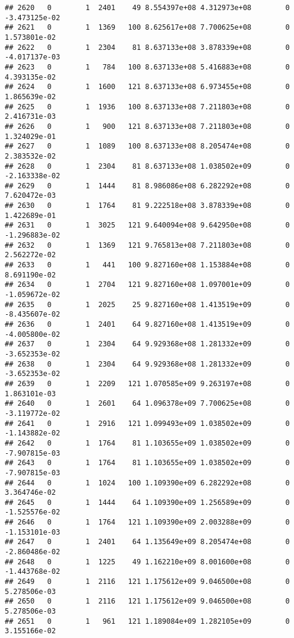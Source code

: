 \documentclass[
]{article}
\begin{document}
\begin{enumerate}
\begin{verbatim}
## 2620   0        1  2401    49 8.554397e+08 4.312973e+08        0 -3.473125e-02
## 2621   0        1  1369   100 8.625617e+08 7.700625e+08        0  1.573801e-02
## 2622   0        1  2304    81 8.637133e+08 3.878339e+08        0 -4.017137e-03
## 2623   0        1   784   100 8.637133e+08 5.416883e+08        0  4.393135e-02
## 2624   0        1  1600   121 8.637133e+08 6.973455e+08        0  1.865639e-02
## 2625   0        1  1936   100 8.637133e+08 7.211803e+08        0  2.416731e-03
## 2626   0        1   900   121 8.637133e+08 7.211803e+08        0  1.324029e-01
## 2627   0        1  1089   100 8.637133e+08 8.205474e+08        0  2.383532e-02
## 2628   0        1  2304    81 8.637133e+08 1.038502e+09        0 -2.163338e-02
## 2629   0        1  1444    81 8.986086e+08 6.282292e+08        0  7.620472e-03
## 2630   0        1  1764    81 9.222518e+08 3.878339e+08        0  1.422689e-01
## 2631   0        1  3025   121 9.640094e+08 9.642950e+08        0 -1.296883e-02
## 2632   0        1  1369   121 9.765813e+08 7.211803e+08        0  2.562272e-02
## 2633   0        1   441   100 9.827160e+08 1.153884e+08        0  8.691190e-02
## 2634   0        1  2704   121 9.827160e+08 1.097001e+09        0 -1.059672e-02
## 2635   0        1  2025    25 9.827160e+08 1.413519e+09        0 -8.435607e-02
## 2636   0        1  2401    64 9.827160e+08 1.413519e+09        0 -4.005800e-02
## 2637   0        1  2304    64 9.929368e+08 1.281332e+09        0 -3.652353e-02
## 2638   0        1  2304    64 9.929368e+08 1.281332e+09        0 -3.652353e-02
## 2639   0        1  2209   121 1.070585e+09 9.263197e+08        0  1.863101e-03
## 2640   0        1  2601    64 1.096378e+09 7.700625e+08        0 -3.119772e-02
## 2641   0        1  2916   121 1.099493e+09 1.038502e+09        0 -1.143882e-02
## 2642   0        1  1764    81 1.103655e+09 1.038502e+09        0 -7.907815e-03
## 2643   0        1  1764    81 1.103655e+09 1.038502e+09        0 -7.907815e-03
## 2644   0        1  1024   100 1.109390e+09 6.282292e+08        0  3.364746e-02
## 2645   0        1  1444    64 1.109390e+09 1.256589e+09        0 -1.525576e-02
## 2646   0        1  1764   121 1.109390e+09 2.003288e+09        0 -1.153101e-03
## 2647   0        1  2401    64 1.135649e+09 8.205474e+08        0 -2.860486e-02
## 2648   0        1  1225    49 1.162210e+09 8.001600e+08        0 -1.443768e-02
## 2649   0        1  2116   121 1.175612e+09 9.046500e+08        0  5.278506e-03
## 2650   0        1  2116   121 1.175612e+09 9.046500e+08        0  5.278506e-03
## 2651   0        1   961   121 1.189084e+09 1.282105e+09        0  3.155166e-02

\end{verbatim}
\end{enumerate}
\end{document}
